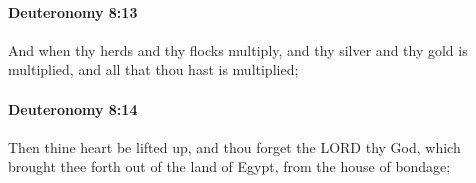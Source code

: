 		\paragraph{Deuteronomy 8:13} %
			\label{DEUTERONOMY-8-13}

			And when thy herds and thy flocks multiply, and thy silver and thy gold is multiplied, and all that thou hast is multiplied;


		\paragraph{Deuteronomy 8:14} %
			\label{DEUTERONOMY-8-14}

			Then thine heart be lifted up, and thou forget the LORD thy God, which brought thee forth out of the land of Egypt, from the house of bondage;


